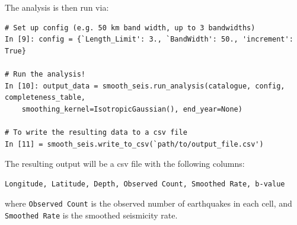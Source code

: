 The analysis is then run via:

\begin{Verbatim}[frame=single, commandchars=\\\{\}, fontsize=\scriptsize]
# Set up config (e.g. 50 km band width, up to 3 bandwidths)
In [9]: config = {`Length_Limit': 3., `BandWidth': 50., 'increment': True}

# Run the analysis!
In [10]: output_data = smooth_seis.run_analysis(catalogue, config, completeness_table, 
    smoothing_kernel=IsotropicGaussian(), end_year=None)

# To write the resulting data to a csv file
In [11] = smooth_seis.write_to_csv(`path/to/output_file.csv')
\end{Verbatim}

The resulting output will be a csv file with the following columns:
\begin{Verbatim}[frame=single, commandchars=\\\{\}, fontsize=\scriptsize]
Longitude, Latitude, Depth, Observed Count, Smoothed Rate, b-value
\end{Verbatim}

\noindent where \verb=Observed Count= is the observed number of earthquakes in each cell, and \\ 
\verb=Smoothed Rate= is the smoothed seismicity rate.







